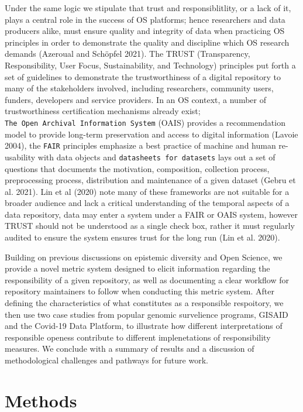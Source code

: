 \documentclass{article}
\begin{document}
Under the same logic we stipulate that trust and responsiblitlity, or a
lack of it, plays a central role in the success of OS platforms; hence
researchers and data producers alike, must ensure quality and integrity
of data when practicing OS principles in order to demonstrate the
quality and discipline which OS research demands (Azeroual and Schöpfel
2021). The TRUST (Transparency, Responsibility, User Focus,
Sustainability, and Technology) principles put forth a set of guidelines
to demonstrate the trustworthiness of a digital repository to many of
the stakeholders involved, including researchers, community users,
funders, developers and service providers. In an OS context, a number of
trustworthiness certification mechanisms already exist;
\texttt{The\ Open\ Archival\ Information\ System} (OAIS) provides a
recommendation model to provide long-term preservation and access to
digital information (Lavoie 2004), the \texttt{FAIR} principles
emphasize a best practice of machine and human re-usability with data
objects and \texttt{datasheets\ for\ datasets} lays out a set of
questions that documents the motivation, composition, collection
process, preprocessing process, distribution and maintenance of a given
dataset (Gebru et al. 2021). Lin et al (2020) note many of these
frameworks are not suitable for a broader audience and lack a critical
understanding of the temporal aspects of a data repository, data may
enter a system under a FAIR or OAIS system, however TRUST should not be
understood as a single check box, rather it must regularly audited to
ensure the system ensures trust for the long run (Lin et al. 2020).

Building on previous discussions on epistemic diversity and Open
Science, we provide a novel metric system designed to elicit information
regarding the responsibility of a given repository, as well as
documenting a clear workflow for repository maintainers to follow when
conducting this metric system. After defining the characteristics of
what constitutes as a responsible respoitory, we then use two case
studies from popular genomic survelience programs, GISAID and the
Covid-19 Data Platform, to illustrate how different interpretations of
responsible openess contribute to different implenetations of
responsibility measures. We conclude with a summary of results and a
discussion of methodological challenges and pathways for future work.

\newpage

\hypertarget{methods}{%
\section{Methods}\label{methods}}
\end{document}
